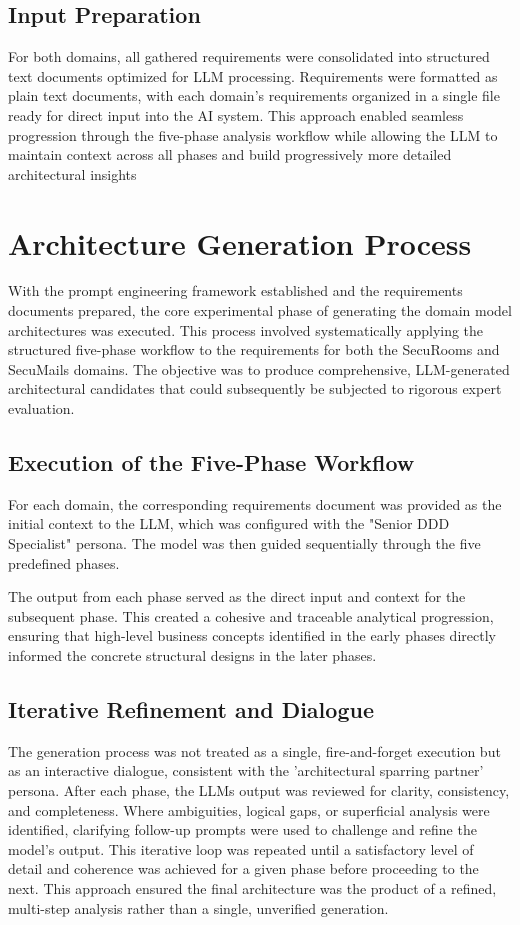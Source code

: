 \subsection{Input Preparation}
For both domains, all gathered requirements were consolidated into structured text documents optimized for LLM processing. Requirements were formatted as plain text documents, with each domain's requirements organized in a single file ready for direct input into the AI system. This approach enabled seamless progression through the five-phase analysis workflow while allowing the LLM to maintain context across all phases and build progressively more detailed architectural insights

\section{Architecture Generation Process}
With the prompt engineering framework established and the requirements documents prepared, the core experimental phase of generating the domain model architectures was executed. This process involved systematically applying the structured five-phase workflow to the requirements for both the SecuRooms and SecuMails domains. The objective was to produce comprehensive, LLM-generated architectural candidates that could subsequently be subjected to rigorous expert evaluation.

\subsection{Execution of the Five-Phase Workflow}
For each domain, the corresponding requirements document was provided as the initial context to the LLM, which was configured with the "Senior DDD Specialist" persona. The model was then guided sequentially through the five predefined phases.

The output from each phase served as the direct input and context for the subsequent phase. This created a cohesive and traceable analytical progression, ensuring that high-level business concepts identified in the early phases directly informed the concrete structural designs in the later phases.

\subsection{Iterative Refinement and Dialogue}
The generation process was not treated as a single, fire-and-forget execution but as an interactive dialogue, consistent with the 'architectural sparring partner' persona. After each phase, the LLMs output was reviewed for clarity, consistency, and completeness. Where ambiguities, logical gaps, or superficial analysis were identified, clarifying follow-up prompts were used to challenge and refine the model's output. This iterative loop was repeated until a satisfactory level of detail and coherence was achieved for a given phase before proceeding to the next. This approach ensured the final architecture was the product of a refined, multi-step analysis rather than a single, unverified generation.

